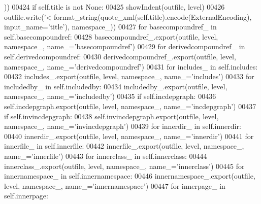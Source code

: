 \begin{DoxyCode}
{{{{{{{{{{{{{{{{{{{{{{{{{{{{{{      ))
00424         \textcolor{keywordflow}{if} self.title \textcolor{keywordflow}{is} \textcolor{keywordflow}{not} \textcolor{keywordtype}{None}:
00425             showIndent(outfile, level)
00426             outfile.write(\textcolor{stringliteral}{'<%
      format_string(quote_xml(self.title).encode(ExternalEncoding), input\_name=\textcolor{stringliteral}{'title'}), namespace\_))
00427         \textcolor{keywordflow}{for} basecompoundref\_ \textcolor{keywordflow}{in} self.basecompoundref:
00428             basecompoundref\_.export(outfile, level, namespace\_, name\_=\textcolor{stringliteral}{'basecompoundref'})
00429         \textcolor{keywordflow}{for} derivedcompoundref\_ \textcolor{keywordflow}{in} self.derivedcompoundref:
00430             derivedcompoundref\_.export(outfile, level, namespace\_, name\_=\textcolor{stringliteral}{'derivedcompoundref'})
00431         \textcolor{keywordflow}{for} includes\_ \textcolor{keywordflow}{in} self.includes:
00432             includes\_.export(outfile, level, namespace\_, name\_=\textcolor{stringliteral}{'includes'})
00433         \textcolor{keywordflow}{for} includedby\_ \textcolor{keywordflow}{in} self.includedby:
00434             includedby\_.export(outfile, level, namespace\_, name\_=\textcolor{stringliteral}{'includedby'})
00435         \textcolor{keywordflow}{if} self.incdepgraph:
00436             self.incdepgraph.export(outfile, level, namespace\_, name\_=\textcolor{stringliteral}{'incdepgraph'})
00437         \textcolor{keywordflow}{if} self.invincdepgraph:
00438             self.invincdepgraph.export(outfile, level, namespace\_, name\_=\textcolor{stringliteral}{'invincdepgraph'})
00439         \textcolor{keywordflow}{for} innerdir\_ \textcolor{keywordflow}{in} self.innerdir:
00440             innerdir\_.export(outfile, level, namespace\_, name\_=\textcolor{stringliteral}{'innerdir'})
00441         \textcolor{keywordflow}{for} innerfile\_ \textcolor{keywordflow}{in} self.innerfile:
00442             innerfile\_.export(outfile, level, namespace\_, name\_=\textcolor{stringliteral}{'innerfile'})
00443         \textcolor{keywordflow}{for} innerclass\_ \textcolor{keywordflow}{in} self.innerclass:
00444             innerclass\_.export(outfile, level, namespace\_, name\_=\textcolor{stringliteral}{'innerclass'})
00445         \textcolor{keywordflow}{for} innernamespace\_ \textcolor{keywordflow}{in} self.innernamespace:
00446             innernamespace\_.export(outfile, level, namespace\_, name\_=\textcolor{stringliteral}{'innernamespace'})
00447         \textcolor{keywordflow}{for} innerpage\_ \textcolor{keywordflow}{in} self.innerpage:
}}}}}}}}}}}}}}}}}}}}}}}}}}}}}}}
\end{DoxyCode}
